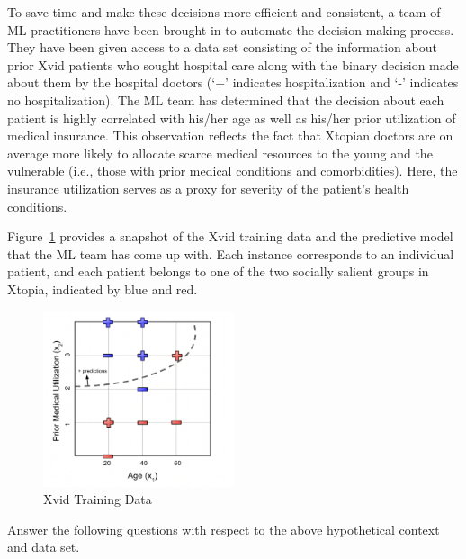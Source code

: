 \documentclass[11pt,addpoints,answers]{exam}
\begin{document}
\begin{questions}
To save time and make these decisions more efficient and consistent, a team of ML practitioners have been brought in to automate the decision-making process. They have been given access to a data set consisting of the information about prior Xvid patients who sought hospital care along with the binary decision made about them by the hospital doctors (`+' indicates hospitalization and `-' indicates no hospitalization). The ML team has determined that the decision about each patient is highly correlated with his/her age as well as his/her prior utilization of medical insurance. This observation reflects the fact that Xtopian doctors are on average more likely to allocate scarce medical resources to the young and the vulnerable (i.e., those with prior medical conditions and comorbidities). Here, the insurance utilization serves as a proxy for severity of the patient's health conditions.

Figure~\ref{fig:dataset} provides a snapshot of the Xvid training data and the predictive model that the ML team has come up with. Each instance corresponds to an individual patient, and each patient belongs to one of the two socially salient groups in Xtopia, indicated by blue and red.

\begin{figure}[h!]
    \centering
    \includegraphics[width=0.5\textwidth]{fig/cartoon_dataset.png}
    \caption{Xvid Training Data}
   \label{fig:dataset}
\end{figure}

Answer the following questions with respect to the above hypothetical context and data set.

\newpage
{}
\end{questions}
\end{document}
